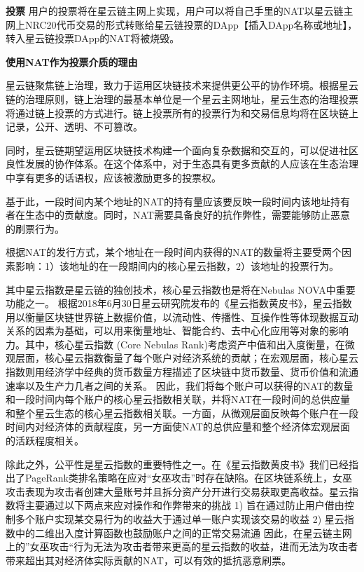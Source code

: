 \textbf{投票}
用户的投票将在星云链主网上实现，用户可以将自己手里的NAT以星云链主网上NRC20代币交易的形式转账给星云链投票的DApp【插入DApp名称或地址】，转入星云链投票DApp的NAT将被烧毁。

\textbf{使用NAT作为投票介质的理由}

星云链聚焦链上治理，致力于运用区块链技术来提供更公平的协作环境。根据星云链的治理原则，链上治理的最基本单位是一个星云主网地址，星云生态的治理投票将通过链上投票的方式进行。链上投票所有的投票行为和交易信息均将在区块链上记录，公开、透明、不可篡改。

同时，星云链期望运用区块链技术构建一个面向复杂数据和交互的，可以促进社区良性发展的协作体系。在这个体系中，对于生态具有更多贡献的人应该在生态治理中享有更多的话语权，应该被激励更多的投票权。

基于此，一段时间内某个地址的NAT的持有量应该要反映一段时间内该地址持有者在生态中的贡献度。同时，NAT需要具备良好的抗作弊性，需要能够防止恶意的刷票行为。


根据NAT的发行方式，某个地址在一段时间内获得的NAT的数量将主要受两个因素影响：1）该地址的在一段期间内的核心星云指数，2）该地址的投票行为。


其中星云指数是星云链的独创技术，核心星云指数也是将在Nebulas NOVA中重要功能之一。
根据2018年6月30日星云研究院发布的《星云指数黄皮书》，星云指数用以衡量区块链世界链上数据价值，以流动性、传播性、互操作性等体现数据互动关系的因素为基础，可以用来衡量地址、智能合约、去中心化应用等对象的影响力。其中，核心星云指数
(Core Nebulas Rank)考虑资产中值和出入度衡量，在微观层面，核心星云指数衡量了每个账户对经济系统的贡献；在宏观层面，核心星云指数则用经济学中经典的货币数量方程描述了区块链中货币数量、货币价值和流通速率以及生产力几者之间的关系。
因此，我们将每个账户可以获得的NAT的数量和一段时间内每个账户的核心星云指数相关联，并将NAT在一段时间的总供应量和整个星云生态的核心星云指数相关联。一方面，从微观层面反映每个账户在一段时间内对经济体的贡献程度，另一方面使NAT的总供应量和整个经济体宏观层面的活跃程度相关。

除此之外，公平性是星云指数的重要特性之一。在《星云指数黄皮书》我们已经指出了PageRank类排名策略在应对“女巫攻击”时存在缺陷。在区块链系统上，女巫攻击表现为攻击者创建大量账号并且拆分资产分开进行交易获取更高收益。星云指数将主要通过以下两点来应对操作和作弊带来的挑战
1)	旨在通过防止用户借由控制多个账户实现某交易行为的收益大于通过单一账户实现该交易的收益
2)	星云指数中的二维出入度计算函数也鼓励账户之间的正常交易流通
因此，在星云链主网上的”女巫攻击“行为无法为攻击者带来更高的星云指数的收益，进而无法为攻击者带来超出其对经济体实际贡献的NAT，可以有效的抵抗恶意刷票。

